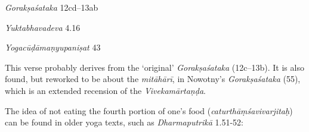 \begin{ekdosis}
\begin{sources}[hp01_058]
\emph{Gorakṣaśataka} 12cd–13ab

\begin{versinnote}
\end{versinnote}

\end{sources}

\begin{testimonia}[hp01_058]
\emph{Yuktabhavadeva} 4.16

\begin{versinnote}
\end{versinnote}

\emph{Yogacūḍāmaṇyupaniṣat} 43

\begin{versinnote}
\end{versinnote}

\end{testimonia}

\begin{philcomm}[hp01_058]
This verse probably derives from the ‘original’ \emph{Gorakṣaśataka} (12c–13b). It is also found, but reworked to be about the \emph{mitāhārī}, in Nowotny’s \emph{Gorakṣaśataka} (55), which is an extended recension of the \emph{Vivekamārtaṇḍa}. 

The idea of not eating the fourth portion of one’s food (\emph{caturthāṃśavivarjitaḥ}) can be found in older yoga texts, such as \emph{Dharmaputrikā} 1.51-52:

\begin{versinnote}
\end{versinnote}


\end{philcomm}
\end{ekdosis}
